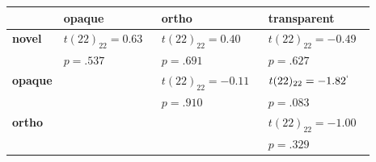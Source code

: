 \begin{center}
\begin{tabular}{llll}
\toprule
 & opaque & ortho & transparent \\
\midrule
\textbf{novel} & $t(22)_{22}=0.63^{    \ \ \ \ }$ & $t(22)_{22}=0.40^{    \ \ \ \ }$ & $t(22)_{22}=-0.49^{    \ \ \ \ }$ \\
 & $p=.537$ & $p=.691$ & $p=.627$ \\
\textbf{opaque} &  & $t(22)_{22}=-0.11^{    \ \ \ \ }$ & $t(22)_{22}=-1.82^{`   \ \ \ }$ \\
 &  & $p=.910$ & $p=.083$ \\
\textbf{ortho} &  &  & $t(22)_{22}=-1.00^{    \ \ \ \ }$ \\
 &  &  & $p=.329$ \\
\bottomrule
\end{tabular}
\end{center}